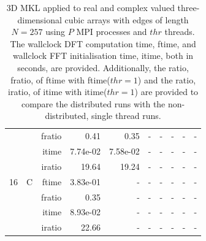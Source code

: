 \documentclass[a4paper]{article}
\begin{document}
\begin{table}[htbp]
\begin{center}
\begin{small}
\begin{tabular}{|r|r|r|r|r|r|r|r|r|r|}
          &      & fratio & 0.41 & 0.35 &     -     &     -     &     -     &     -     &     -     \\   
          &      & itime & 7.74e-02 & 7.58e-02 &     -     &     -     &     -     &     -     &     -     \\   
          &      & iratio & 19.64 & 19.24 &     -     &     -     &     -     &     -     &     -     \\ \hline 
     16 & C & ftime & 3.83e-01 &     -     &     -     &     -     &     -     &     -     &     -     \\   
          &      & fratio & 0.35 &     -     &     -     &     -     &     -     &     -     &     -     \\   
          &      & itime & 8.93e-02 &     -     &     -     &     -     &     -     &     -     &     -     \\   
          &      & iratio & 22.66 &     -     &     -     &     -     &     -     &     -     &     -     \\ \hline 

\end{tabular}
\caption{3D MKL applied to real and complex valued three-dimensional cubic arrays with edges of length $N=257$ using $P$ MPI processes and $thr$ threads. The wallclock DFT computation time, ftime, and wallclock FFT initialisation time, itime, both in seconds, are provided. Additionally, the ratio, fratio, of ftime  with ftime($thr=1$) and the ratio, iratio, of itime  with itime($thr=1$) are provided to compare the distributed runs with the non-distributed, single thread runs.  }\label{TblMKL3d257}
\end{small}
\end{center}
\end{table}
\end{document}
